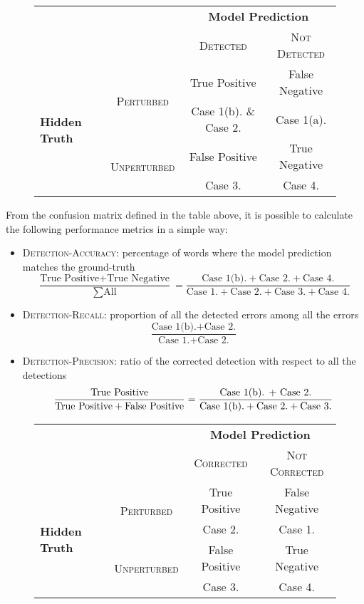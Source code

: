 \begin{figure}[H]
	\centering
	\begin{tabular}{lc|cc}
		\toprule
		& & \multicolumn{2}{c}{\textbf{Model Prediction}}\\
		& & \textsc{Detected}  & \textsc{Not Detected} \\
		\midrule
		\multirow{4}{*}{\textbf{Hidden Truth}} 
		& \multirow{2}{*}{\textsc{Perturbed}}   & True Positive & False Negative	\\ 
		& &  Case 1(b). \& Case 2. & Case 1(a).	\\ 
		& \multirow{2}{*}{\textsc{Unperturbed}}  & False Positive & True Negative	\\
		& &  Case 3.  & Case 4.	\\ 
		\bottomrule
	\end{tabular}
	\label{tab:confmat-detection}
\end{figure}

From the confusion matrix defined in the table above, it is possible to calculate the following performance 
metrics in a simple way:
\begin{itemize}
	\item \textsc{Detection-Accuracy}: percentage of words where the model prediction matches the 
	ground-truth  
	\[ \frac{\mbox{True Positive} + \mbox{True Negative}}{\sum \mbox{All}} = \frac{\mbox{Case 1(b).} + 
	\mbox{Case 2.} + \mbox{Case 4.}}{\mbox{Case 1.} + \mbox{Case 2.} + \mbox{Case 3.} + \mbox{Case 4.}}\]
	\item \textsc{Detection-Recall}: proportion of all the detected errors among all the errors
	\[ \frac{\mbox{Case 1(b).} + \mbox{Case 2.}}{\mbox{Case 1.} + \mbox{Case 2.}}\]
	\item \textsc{Detection-Precision}: ratio of the corrected detection with respect to all the detections
		\[ \frac{\mbox{True Positive}}{\mbox{True Positive} + \mbox{False Positive}} = \frac{\mbox{Case 1(b). + 
		\mbox{Case 2.}}}{\mbox{Case 1(b).}+  \mbox{Case 2.} + \mbox{Case 3.}}\]
\end{itemize}


\begin{figure}[H]
	\centering
	\begin{tabular}{lc|cc}
		\toprule
		& & \multicolumn{2}{c}{\textbf{Model Prediction}}\\
		& & \textsc{Corrected}  & \textsc{Not Corrected} \\
		\midrule
		\multirow{4}{*}{\textbf{Hidden Truth}} 
		& \multirow{2}{*}{\textsc{Perturbed}}   & True Positive & False Negative	\\ 
			& & Case 2. & Case 1.	\\ 
		& \multirow{2}{*}{\textsc{Unperturbed}}  & False Positive & True Negative	\\
		& &  Case 3.  & Case 4.	\\ 
		\bottomrule
	\end{tabular}
	\label{tab:confma-error}
\end{figure}


